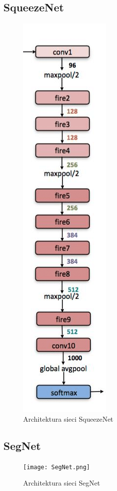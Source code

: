 \documentclass[a4paper,twoside,titlepage,openright]{book}
\begin{document}
\subsection{SqueezeNet}
\begin{figure}[h]
	\centering
			\includegraphics[resolution=120]{SqueezeNet.png}
		\caption{Architektura sieci SqueezeNet}
\end{figure}

\subsection{SegNet}
\begin{figure}[h]
	\centering
			\texttt{[image: SegNet.png]}
		\caption{Architektura sieci SegNet}
\end{figure}
\end{document}
